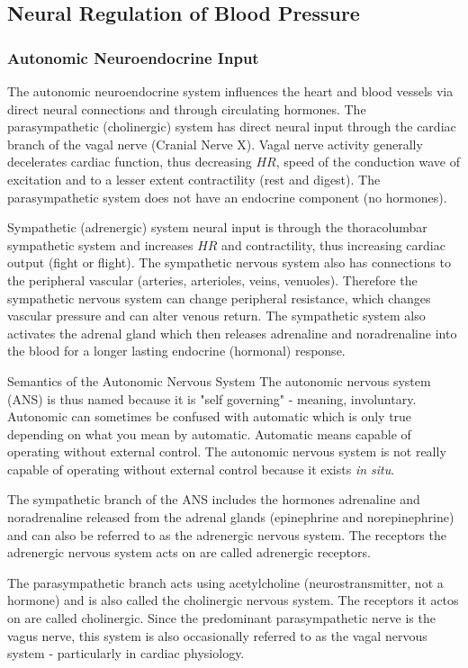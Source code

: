 \subsection{Neural Regulation of Blood Pressure}

\subsubsection{Autonomic Neuroendocrine Input}

The autonomic neuroendocrine system influences the heart and blood vessels via direct neural connections and through circulating hormones. The parasympathetic (cholinergic) system has direct neural input through the cardiac branch of the vagal nerve (Cranial Nerve X). Vagal nerve activity generally decelerates cardiac function, thus decreasing $HR$, speed of the conduction wave of excitation and to a lesser extent contractility (rest and digest). The parasympathetic system does not have an endocrine component (no hormones).

Sympathetic (adrenergic) system neural input is through the thoracolumbar sympathetic system and increases $HR$ and contractility, thus increasing cardiac output (fight or flight). The sympathetic nervous system also has connections to the peripheral vascular (arteries, arterioles, veins, venuoles). Therefore the sympathetic nervous system can change peripheral resistance, which changes vascular pressure and can alter venous return. The sympathetic system also activates the adrenal gland which then releases adrenaline and noradrenaline into the blood for a longer lasting endocrine (hormonal) response.

\begin{backgroundinformation}{Semantics of the Autonomic Nervous System}
    The autonomic nervous system (ANS) is thus named because it is "self governing" - meaning, involuntary. Autonomic can sometimes be confused with automatic which is only true depending on what you mean by automatic. Automatic means capable of operating without external control. The autonomic nervous system is not really capable of operating without external control because it exists \textit{in situ}.
    
    The sympathetic branch of the ANS includes the hormones adrenaline and noradrenaline released from the adrenal glands (epinephrine and norepinephrine) and can also be referred to as the adrenergic nervous system. The receptors the adrenergic nervous system acts on are called adrenergic receptors. 
    
    The parasympathetic branch acts using acetylcholine (neurostransmitter, not a hormone) and is also called the cholinergic nervous system. The receptors it actos on are called cholinergic. Since the predominant parasympathetic nerve is the vagus nerve, this system is also occasionally referred to as the vagal nervous system - particularly in cardiac physiology.
\end{backgroundinformation}

